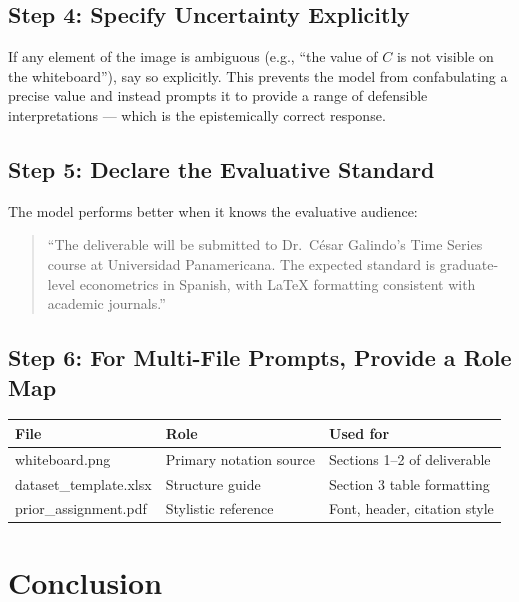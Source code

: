 \documentclass[12pt,a4paper]{article}
\begin{document}
\subsection{Step 4: Specify Uncertainty Explicitly}

If any element of the image is ambiguous (e.g., ``the value of $C$ is not
visible on the whiteboard''), say so explicitly. This prevents the model from
confabulating a precise value and instead prompts it to provide a range of
defensible interpretations — which is the epistemically correct response.

\subsection{Step 5: Declare the Evaluative Standard}

The model performs better when it knows the evaluative audience:
\begin{quote}
``The deliverable will be submitted to Dr.\ César Galindo's Time Series course
at Universidad Panamericana. The expected standard is graduate-level econometrics
in Spanish, with LaTeX formatting consistent with academic journals.''
\end{quote}

\subsection{Step 6: For Multi-File Prompts, Provide a Role Map}

\begin{center}
\begin{tabular}{lll}
\toprule
\textbf{File} & \textbf{Role} & \textbf{Used for} \\
\midrule
whiteboard.png & Primary notation source & Sections 1–2 of deliverable \\
dataset\_template.xlsx & Structure guide & Section 3 table formatting \\
prior\_assignment.pdf & Stylistic reference & Font, header, citation style \\
\bottomrule
\end{tabular}
\end{center}

\section{Conclusion}
\end{document}
